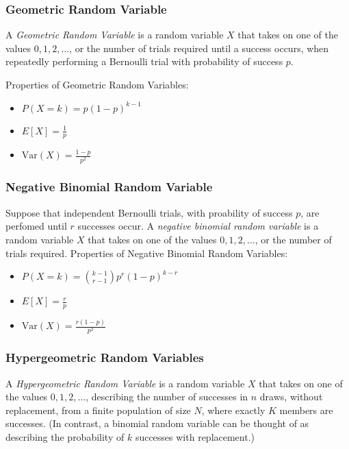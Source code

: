 \documentclass[10pt]{article}
\begin{document}
		\subsubsection*{Geometric Random Variable}
		A \emph{Geometric Random Variable} is a random variable $X$ that takes on one of the values $0, 1, 2, \ldots$, or the number of trials required until a success occurs, when repeatedly performing a Bernoulli trial with probability of success $p$.
		
		\noindent Properties of Geometric Random Variables:
		\begin{multicols}{3}
			\begin{itemize}
				\item $P(X=k) = p(1-p)^{k-1}$
				\item $E[X] = \frac{1}{p}$
				\item $\text{Var}(X)= \frac{1-p}{p^2} $
			\end{itemize}
		\end{multicols}
		
		\subsubsection*{Negative Binomial Random Variable}
		
		Suppose that independent Bernoulli trials, with proability of success $p$, are perfomed until $r$ successes occur. A \emph{negative binomial random variable} is a random variable $X$ that takes on one of the values $0, 1, 2, \ldots$, or the number of trials required.
		\noindent Properties of Negative Binomial Random Variables:
		
		\begin{multicols}{3}
			\begin{itemize}
				\item $P(X=k) = {{k-1} \choose {r-1}}p^r(1-p)^{k-r}$
				\item $E[X] = \frac{r}{p}$
				\item $\text{Var}(X)= \frac{r(1-p)}{p^2} $
			\end{itemize}
		\end{multicols}
		
		\subsubsection*{Hypergeometric Random Variables}
		A \emph{Hypergeometric Random Variable} is a random variable $X$ that takes on one of the values $0, 1, 2, \ldots$, describing the number of successes in $n$ draws, without replacement, from a finite population of size $N$, where exactly $K$ members are successes. (In contrast, a binomial random variable can be thought of as describing the probability of $k$ successes with replacement.)
		
\end{document}
